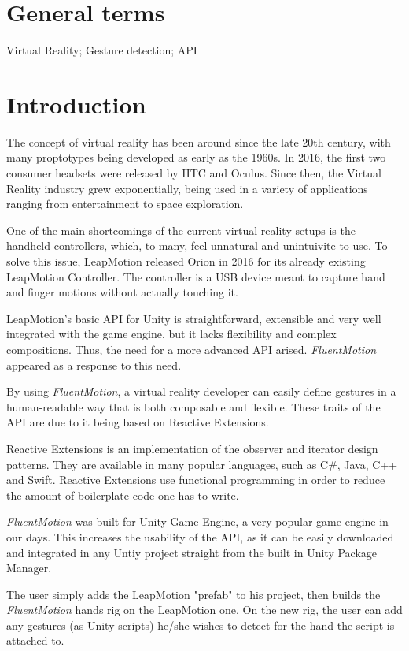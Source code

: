 \documentclass{sigchi}
\def\fluentmotion{\textit{FluentMotion}}
\def\rx{Reactive Extensions}
\def\unity{Unity Game Engine}
\def\leap{LeapMotion}
\def\vr{Virtual Reality}
\begin{document}
\section{General terms}
Virtual Reality; Gesture detection; API

\section{Introduction}
The concept of virtual reality has been around since the late 20th century, with many proptotypes being developed as early as the 1960s. In 2016, the first two consumer headsets were released by HTC and Oculus. Since then, the \vr{} industry grew exponentially, being used in a variety of applications ranging from entertainment to space exploration.


One of the main shortcomings of the current virtual reality setups is the handheld controllers, which, to many, feel unnatural and unintuivite to use. To solve this issue, LeapMotion released Orion \cite{Orion} in 2016 for its already existing LeapMotion Controller. The controller is a USB device meant to capture hand and finger motions without actually touching it.


\leap{}'s basic API for Unity is straightforward, extensible and very well integrated with the game engine, but it lacks flexibility and complex compositions. Thus, the need for a more advanced API arised. \fluentmotion{} appeared as a response to this need.


By using \fluentmotion{}, a virtual reality developer can easily define gestures in a human-readable way that is both composable and flexible. These traits of the API are due to it being based on \rx{}.


\rx{} is an implementation of the observer \cite{DPEROOS} and iterator design patterns. They are available in many popular languages, such as C\#, Java, C++ and Swift. \rx{} use functional programming in order to reduce the amount of boilerplate code one has to write.


\fluentmotion{} was built for \unity{}, a very popular game engine in our days. This increases the usability of the API, as it can be easily downloaded and integrated in any Untiy project straight from the built in Unity Package Manager.


The user simply adds the \leap{} "prefab" to his project, then builds the \fluentmotion{} hands rig on the \leap{} one. On the new rig, the user can add any gestures (as Unity scripts) he/she wishes to detect for the hand the script is attached to.
\end{document}
